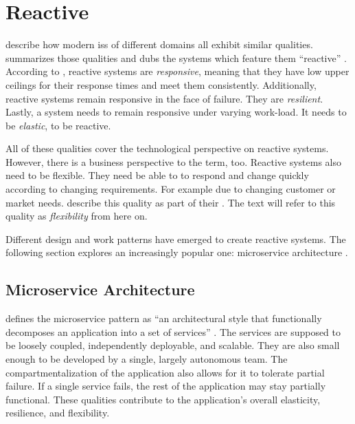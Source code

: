 
\section{Reactive }\label{sec:reactive-is}

\citeauthor{boner_reactive_2014} describe how modern \glspl{is} of different domains all exhibit similar qualities.
 summarizes those qualities and dubs the systems which feature them \enquote{reactive} \parencite{boner_reactive_2014}.
According to \cite{boner_reactive_2014}, reactive systems are \emph{responsive}, meaning that they have low upper ceilings for their response times and meet them consistently.
Additionally, reactive systems remain responsive in the face of failure.
They are \emph{resilient}.
Lastly, a system needs to remain responsive under varying work-load.
It needs to be \emph{elastic}, to be reactive.

All of these qualities cover the technological perspective on reactive systems.
However, there is a business perspective to the term, too.
Reactive systems also need to be flexible.
They need be able to to respond and change quickly according to changing requirements.
For example due to changing customer or market needs.
\citeauthor{beck2001agile} describe this quality as part of their  \parencite{beck2001agile}.
The text will refer to this quality as \emph{flexibility} from here on.

Different design and work patterns have emerged to create reactive systems.
The following section explores an increasingly popular one: microservice architecture \parencite{loukides_microservice_adoption_2020}.

\subsection{Microservice Architecture}

\citeauthor{richardson_microservices_2019} defines the microservice pattern as \enquote{an architectural style that functionally decomposes an application into a set of services} \parencite[11]{richardson_microservices_2019}.
The services are supposed to be loosely coupled, independently deployable, and scalable.
They are also small enough to be developed by a single, largely autonomous team.
The compartmentalization of the application also allows for it to tolerate partial failure.
If a single service fails, the rest of the application may stay partially functional.
\parencite[14f.]{richardson_microservices_2019}
These qualities contribute to the application's overall elasticity, resilience, and flexibility.

